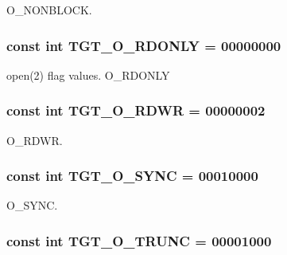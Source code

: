 O\_\-NONBLOCK. \hypertarget{classPowerLinux_ad266b23a0ae07d1833e18bae651f3411}{
\subsubsection[{TGT\_\-O\_\-RDONLY}]{\setlength{\rightskip}{0pt plus 5cm}const int {\bf TGT\_\-O\_\-RDONLY} = 00000000}}
\label{classPowerLinux_ad266b23a0ae07d1833e18bae651f3411}


open(2) flag values. O\_\-RDONLY \hypertarget{classPowerLinux_ac6fa9ecf5d2f3314f197698f1099e2ac}{
\subsubsection[{TGT\_\-O\_\-RDWR}]{\setlength{\rightskip}{0pt plus 5cm}const int {\bf TGT\_\-O\_\-RDWR} = 00000002}}
\label{classPowerLinux_ac6fa9ecf5d2f3314f197698f1099e2ac}


O\_\-RDWR. \hypertarget{classPowerLinux_abf43ab05d2a5b6b8113952160d8565db}{
\subsubsection[{TGT\_\-O\_\-SYNC}]{\setlength{\rightskip}{0pt plus 5cm}const int {\bf TGT\_\-O\_\-SYNC} = 00010000}}
\label{classPowerLinux_abf43ab05d2a5b6b8113952160d8565db}


O\_\-SYNC. \hypertarget{classPowerLinux_a4f892ee6e1424a2becd859b0bef1f18b}{
\subsubsection[{TGT\_\-O\_\-TRUNC}]{\setlength{\rightskip}{0pt plus 5cm}const int {\bf TGT\_\-O\_\-TRUNC} = 00001000}}
\label{classPowerLinux_a4f892ee6e1424a2becd859b0bef1f18b}


